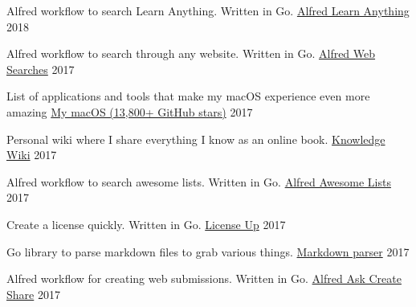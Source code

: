 
\begin{cventries}

  \cventry
    {Alfred workflow to search Learn Anything. Written in Go.}
    {\href{https://github.com/nikitavoloboev/alfred-learn-anything}{Alfred Learn Anything}}
    {}
    {2018}
    {
    }

    \cventry
    {Alfred workflow to search through any website. Written in Go.}
    {\href{https://github.com/nikitavoloboev/alfred-web-searches}{Alfred Web Searches}}
    {}
    {2017}
    {
    }

    \cventry
    {List of applications and tools that make my macOS experience even more amazing}
    {\href{https://github.com/nikitavoloboev/my-mac-os}{My macOS (13,800+ GitHub stars)}}
    {}
    {2017}
    {
    }

    \cventry
    {Personal wiki where I share everything I know as an online book.}
    {\href{https://wiki.nikitavoloboev.xyz}{Knowledge Wiki}}
    {}
    {2017}
    {
    }

    \cventry
    {Alfred workflow to search awesome lists. Written in Go.}
    {\href{https://github.com/nikitavoloboev/alfred-awesome-lists}{Alfred Awesome Lists}}
    {}
    {2017}
    {
    }

    \cventry
    {Create a license quickly. Written in Go.}
    {\href{https://github.com/nikitavoloboev/license-up}{License Up}}
    {}
    {2017}
    {
    }

    \cventry
    {Go library to parse markdown files to grab various things.}
    {\href{https://github.com/nikitavoloboev/markdown-parser}{Markdown parser}}
    {}
    {2017}
    {
    }

    \cventry
    {Alfred workflow for creating web submissions. Written in Go.}
    {\href{https://github.com/nikitavoloboev/alfred-ask-create-share}{Alfred Ask Create Share}}
    {}
    {2017}
    {
    }

\end{cventries}
